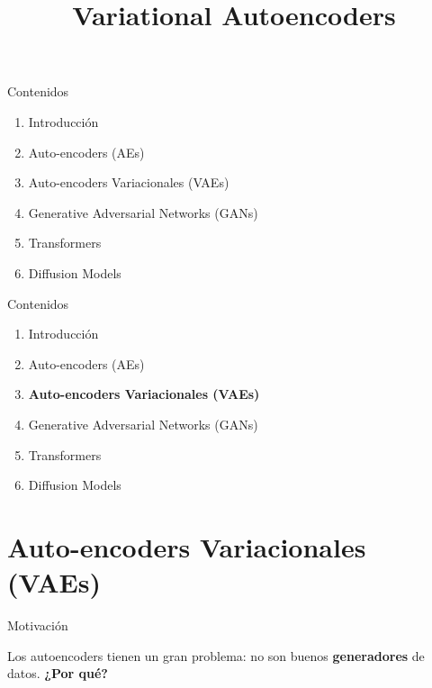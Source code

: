 



\title{Variational Autoencoders}


\maketitle

\begin{frame}{Contenidos}
  \begin{enumerate}
      \item Introducción
      \item Auto-encoders (AEs)
      \item{Auto-encoders Variacionales (VAEs)}
      \item{Generative Adversarial Networks (GANs)}
      \item{Transformers}
      \item{Diffusion Models}
    \end{enumerate}
\end{frame}


\begin{frame}{Contenidos}
  \begin{enumerate}
      \item Introducción
      \item Auto-encoders (AEs)
      \item{\textbf{Auto-encoders Variacionales (VAEs)}}
      \item{Generative Adversarial Networks (GANs)}
      \item{Transformers}
      \item{Diffusion Models}
    \end{enumerate}
\end{frame}

\section{Auto-encoders Variacionales (VAEs)}

\begin{frame}{Motivación}

Los autoencoders tienen un gran problema: no son buenos \textbf{generadores} de datos.
\newline
\newline
\centering\textbf{¿Por qué?}
\end{frame}

